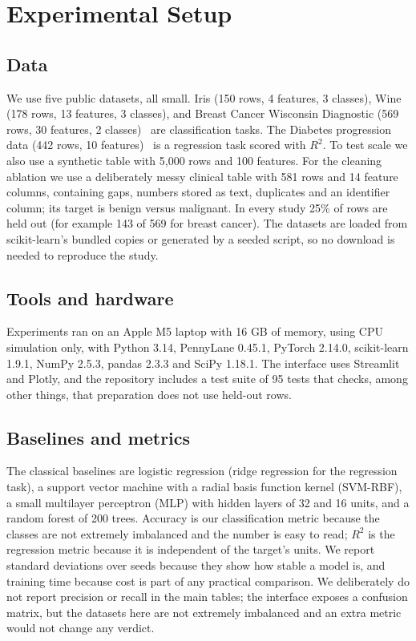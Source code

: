 \documentclass[conference]{IEEEtran}
\begin{document}
\section{Experimental Setup}
\subsection{Data}
We use five public datasets, all small. Iris (150 rows, 4 features, 3 classes), Wine (178 rows, 13 features, 3 classes), and Breast Cancer Wisconsin Diagnostic (569 rows, 30 features, 2 classes)~\cite{wolberg1993wdbc} are classification tasks. The Diabetes progression data (442 rows, 10 features)~\cite{efron2004lars} is a regression task scored with $R^2$. To test scale we also use a synthetic table with 5,000 rows and 100 features. For the cleaning ablation we use a deliberately messy clinical table with 581 rows and 14 feature columns, containing gaps, numbers stored as text, duplicates and an identifier column; its target is benign versus malignant. In every study 25\% of rows are held out (for example 143 of 569 for breast cancer). The datasets are loaded from scikit-learn's bundled copies or generated by a seeded script, so no download is needed to reproduce the study.

\subsection{Tools and hardware}
Experiments ran on an Apple M5 laptop with 16 GB of memory, using CPU simulation only, with Python 3.14, PennyLane 0.45.1, PyTorch 2.14.0, scikit-learn 1.9.1, NumPy 2.5.3, pandas 2.3.3 and SciPy 1.18.1. The interface uses Streamlit and Plotly, and the repository includes a test suite of 95 tests that checks, among other things, that preparation does not use held-out rows.

\subsection{Baselines and metrics}
The classical baselines are logistic regression (ridge regression for the regression task), a support vector machine with a radial basis function kernel (SVM-RBF), a small multilayer perceptron (MLP) with hidden layers of 32 and 16 units, and a random forest of 200 trees. Accuracy is our classification metric because the classes are not extremely imbalanced and the number is easy to read; $R^2$ is the regression metric because it is independent of the target's units. We report standard deviations over seeds because they show how stable a model is, and training time because cost is part of any practical comparison. We deliberately do not report precision or recall in the main tables; the interface exposes a confusion matrix, but the datasets here are not extremely imbalanced and an extra metric would not change any verdict.
\end{document}
